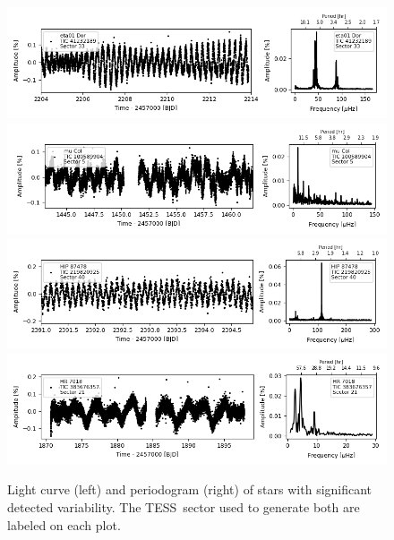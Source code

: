 \documentclass[twocolumn, linenumbers]{aastex631}
\newcommand{\tess}{TESS}
\begin{document}
\begin{figure}
    \centering

    \includegraphics[width=0.9\linewidth]{figures/tic00000041232189_s033_norm1.fits}
    \includegraphics[width=0.9\linewidth]{figures/tic00000100589904_s005_norm1.fits}
    \includegraphics[width=0.9\linewidth]{figures/tic00000219820925_s040_norm1.fits.png}
    \includegraphics[width=0.9\linewidth]{figures/tic00000383676357_s021_norm1.fits.png}

    \caption{Light curve (left) and periodogram (right) of stars with significant detected variability. The \tess\ sector used to generate both are labeled on each plot.}
    \label{fig:lcft3}
\end{figure}
    
\end{document}
